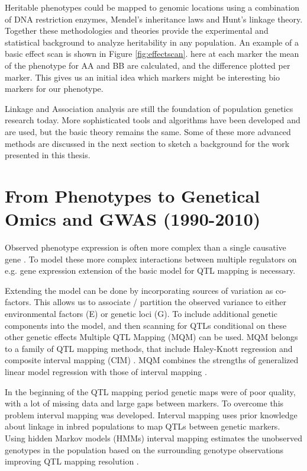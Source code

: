 Heritable phenotypes could be mapped to genomic locations using a combination of DNA 
restriction enzymes, Mendel's inheritance laws and Hunt's linkage theory. Together these 
methodologies and theories provide the experimental and statistical background to 
analyze heritability in any population. An example of a basic effect scan is shown in Figure 
\ref{fig:effectscan}. here at each marker the mean of the phenotype for AA and BB are 
calculated, and the difference plotted per marker. This gives us an initial idea which markers 
might be interesting bio markers for our phenotype. 

Linkage and Association analysis are still the foundation of population genetics research 
today. More sophisticated tools and algorithms have been developed and are used, but the 
basic theory remains the same. Some of these more advanced methods are discussed in the next 
section to sketch a background for the work presented in this thesis.

\section{From Phenotypes to Genetical Omics and GWAS (1990-2010)}

Observed phenotype expression is often more complex than a single causative gene \cite{Sinha:2006, 
West:2007}. To model these more complex interactions between multiple regulators on e.g. gene expression 
extension of the basic model for QTL mapping is necessary. 

Extending the model can be done by incorporating sources of variation as co-factors. This allows us 
to associate / partition the observed variance to either environmental factors (E) or genetic loci 
(G). To include additional genetic components into the model, and then scanning for QTLs conditional 
on these other genetic effects Multiple QTL Mapping (MQM) can be used. MQM belongs to a family 
of QTL mapping methods, that include Haley-Knott regression \cite{Haley:1992} and composite 
interval mapping (CIM) \cite{Zeng:1994}. MQM combines the strengths of generalized linear model 
regression with those of interval mapping \cite{Jansen:1993, Jansen:1994b}. 

In the beginning of the QTL mapping period genetic maps were of poor quality, with a lot of missing 
data and large gaps between markers. To overcome this problem interval mapping was developed. Interval 
mapping uses prior knowledge about linkage in inbred populations to map QTLs between genetic markers. 
Using hidden Markov models (HMMs) interval mapping estimates the unobserved genotypes in the population 
based on the surrounding genotype observations improving QTL mapping resolution \cite{Jansen:1993, Zeng:1994}.

